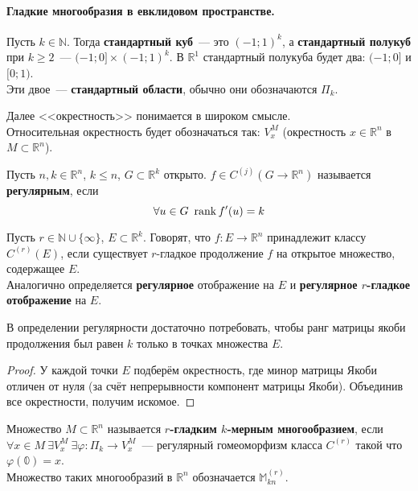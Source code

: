 \documentclass{article}
\let\tmp\varphi
\let\varphi\phi
\let\phi\tmp
\begin{document}
    \paragraph{Гладкие многообразия в евклидовом пространстве.}
    \begin{definition}
        Пусть $k\in\mathbb N$. Тогда \textbf{стандартный куб}~--- это $(-1;1)^k$, а \textbf{стандартный полукуб} при $k\geqslant2$~--- $(-1;0]\times(-1;1)^k$. В $\mathbb R^1$ стандартный полукуба будет два: $(-1;0]$ и $[0;1)$.\\
        Эти двое~--- \textbf{стандартный области}, обычно они обозначаются $\Pi_k$.
    \end{definition}
    \begin{remark}
        Далее <<окрестность>> понимается в широком смысле.\\
        Относительная окрестность будет обозначаться так: $V_x^M$ (окрестность $x\in \mathbb R^n$ в $M\subset\mathbb R^n$).
    \end{remark}
    \begin{definition}
        Пусть $n,k\in\mathbb R^n$, $k\leqslant n$, $G\subset\mathbb R^k$ открыто. $f\in C^{(j)}(G\to\mathbb R^n)$ называется \textbf{регулярным}, если
        $$
        \forall u\in G~\operatorname{rank} f'(u)=k
        $$
    \end{definition}
    \begin{definition}
        Пусть $r\in\mathbb N\cup\{\infty\}$, $E\subset\mathbb R^k$. Говорят, что $f\colon E\to\mathbb R^n$ принадлежит классу $C^{(r)}(E)$, если существует $r$-гладкое продолжение $f$ на открытое множество, содержащее $E$.\\
        Аналогично определяется \textbf{регулярное} отображение на $E$ и \textbf{регулярное $r$-гладкое отображение} на $E$.
    \end{definition}
    \begin{claim}
        В определении регулярности достаточно потребовать, чтобы ранг матрицы якоби продолжения был равен $k$ только в точках множества $E$.
    \end{claim}
    \begin{proof}
        У каждой точки $E$ подберём окрестность, где минор матрицы Якоби отличен от нуля (за счёт непрерывности компонент матрицы Якоби). Объединив все окрестности, получим искомое.
    \end{proof}
    \begin{definition}
        Множество $M\subset\mathbb R^n$ называется \textbf{$r$-гладким $k$-мерным многообразием}, если $\forall x\in M~\exists V_x^M~\exists\phi\colon\Pi_k\to V_x^M$~--- регулярный гомеоморфизм класса $C^{(r)}$ такой что $\phi(\mathbb0)=x$.\\
        Множество таких многообразий в $\mathbb R^n$ обозначается $\mathbb M_{kn}^{(r)}$.
    \end{definition}
\end{document}
